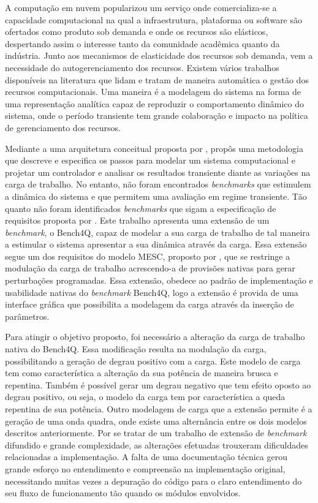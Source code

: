A computação em nuvem popularizou um serviço onde comercializa-se a capacidade computacional na qual a infraestrutura, plataforma ou software são ofertados como produto sob demanda e onde os recursos são elásticos, despertando assim o interesse tanto da comunidade acadêmica quanto da indústria.
Junto aos mecanismos de elasticidade dos recursos sob demanda, vem a necessidade do autogerenciamento dos recursos. Existem vários trabalhos disponíveis na literatura que lidam e tratam de maneira automática o gestão dos recursos computacionais. Uma maneira é a modelagem do sistema na forma de uma representação analítica capaz de reproduzir o comportamento dinâmico do sistema, onde o período transiente tem grande colaboração e impacto na política de gerenciamento dos recursos.

Mediante a uma arquitetura conceitual proposta por ,  propôs uma metodologia que descreve e especifica os passos para modelar um sistema computacional e projetar um controlador e analisar os resultados transiente diante as variações na carga de trabalho. No entanto, não foram encontrados \textit{benchmarks} que estimulem a dinâmica do sistema e que permitem uma avaliação em regime transiente. Tão quanto não foram identificados \textit{benchmarks} que sigam a especificação de requisitos proposta por .
Este trabalho apresenta uma extensão de um \textit{benchmark}, o Bench4Q, capaz de modelar a sua carga de trabalho de tal maneira a estimular o sistema apresentar a sua dinâmica através da carga. Essa extensão segue um dos requisitos do modelo MESC, proposto por , que se restringe a modulação da carga de trabalho acrescendo-a de provisões nativas para gerar perturbações programadas. Essa extensão, obedece ao padrão de implementação e usabilidade nativas do \textit{benchmark} Bench4Q, logo a extensão é provida de uma interface gráfica que possibilita a modelagem da carga através da inserção de parâmetros.

Para atingir o objetivo proposto, foi necessário a alteração da carga de trabalho nativa do Bench4Q. Essa modificação resulta na modulação da carga, possibilitando a geração de degrau positivo com a carga. Este modelo de carga tem como característica a alteração da sua potência de maneira brusca e repentina. Também é possível gerar um degrau negativo que tem efeito oposto ao degrau positivo, ou seja, o modelo da carga tem por característica a queda repentina de sua potência. Outro modelagem de carga que a extensão permite é a geração de uma onda quadra, onde existe uma alternância entre os dois modelos descritos anteriormente. 
Por se tratar de um trabalho de extensão de \textit{benchmark} difundido e grande complexidade, as alterações efetuadas trouxeram dificuldades relacionadas a implementação. A falta de uma documentação técnica gerou grande esforço no entendimento e compreensão na implementação original, necessitando muitas vezes a depuração do código para o claro entendimento do seu fluxo de funcionamento tão quando os módulos envolvidos.

